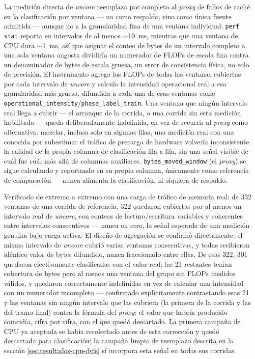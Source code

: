 \documentclass[12pt,oneside,spanish]{book}
\begin{document}
La medición directa de \textit{uncore} reemplaza por completo al \textit{proxy} de fallos de caché en la clasificación por ventana --- no como respaldo, sino como única fuente admitida --- aunque no a la granularidad fina de una ventana individual: \texttt{perf stat} reporta en intervalos de al menos $\sim$10~ms, mientras que una ventana de CPU dura $\sim$1~ms, así que asignar el conteo de bytes de un intervalo completo a una sola ventana angosta dividiría un numerador de FLOPs de escala fina contra un denominador de bytes de escala gruesa, un error de consistencia física, no solo de precisión. El instrumento agrega los FLOPs de todas las ventanas cubiertas por cada intervalo de \textit{uncore} y calcula la intensidad operacional real a esa granularidad más gruesa, difundida a cada una de esas ventanas como \texttt{operational\_intensity}/\texttt{phase\_label\_train}. Una ventana que ningún intervalo real llega a cubrir --- el arranque de la corrida, o una corrida sin esta medición habilitada --- queda deliberadamente indefinida, en vez de recurrir al \textit{proxy} como alternativa: mezclar, incluso solo en algunas filas, una medición real con una conocida por subestimar el tráfico de precarga de hardware volvería inconsistente la calidad de la propia columna de clasificación fila a fila, sin una señal visible de cuál fue cuál más allá de columnas auxiliares. \texttt{bytes\_moved\_window} (el \textit{proxy}) se sigue calculando y reportando en su propia columna, únicamente como referencia de comparación --- nunca alimenta la clasificación, ni siquiera de respaldo.

Verificado de extremo a extremo con una carga de tráfico de memoria real: de 332 ventanas de una corrida de referencia, 322 quedaron cubiertas por al menos un intervalo real de \textit{uncore}, con conteos de lectura/escritura variables y coherentes entre intervalos consecutivos --- nunca en cero, la señal esperada de una medición genuina bajo carga activa. El diseño de agregación se confirmó directamente: el mismo intervalo de \textit{uncore} cubrió varias ventanas consecutivas, y todas recibieron idéntico valor de bytes difundido, nunca fraccionado entre ellas. De esas 322, 301 quedaron efectivamente clasificadas con el valor real; las 21 restantes tenían cobertura de bytes pero al menos una ventana del grupo sin FLOPs medidos válidos, y quedaron correctamente indefinidas en vez de calcular una intensidad con un numerador incompleto --- confirmado explícitamente contrastando esas 21 y las ventanas sin ningún intervalo que las cubriera (la primera de la corrida y las del tramo final) contra la fórmula del \textit{proxy}: el valor que habría producido coincidía, cifra por cifra, con el que quedó descartado. La primera campaña de CPU ya aceptada se había recolectado antes de esta corrección y quedó descartada para clasificación; la campaña limpia de reemplazo descrita en la sección \ref{sec:resultados-cpu-dvfs} sí incorpora esta señal en todas sus corridas.
\end{document}
